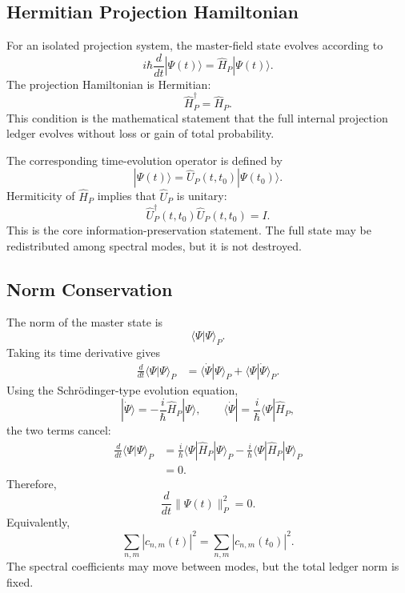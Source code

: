 \documentclass[11pt]{article}
\begin{document}
\subsection{Hermitian Projection Hamiltonian}

For an isolated projection system, the master-field state evolves according to
\begin{equation}
\boxed{
i\hbar\frac{d}{dt}|\Psi(t)\rangle
=
\widehat H_P|\Psi(t)\rangle .
}
\end{equation}
The projection Hamiltonian is Hermitian:
\begin{equation}
\boxed{
\widehat H_P^\dagger
=
\widehat H_P.
}
\end{equation}
This condition is the mathematical statement that the full internal projection
ledger evolves without loss or gain of total probability.

The corresponding time-evolution operator is defined by
\begin{equation}
\boxed{
|\Psi(t)\rangle
=
\widehat U_P(t,t_0)|\Psi(t_0)\rangle .
}
\end{equation}
Hermiticity of \(\widehat H_P\) implies that \(\widehat U_P\) is unitary:
\begin{equation}
\boxed{
\widehat U_P^\dagger(t,t_0)
\widehat U_P(t,t_0)
=
I.
}
\end{equation}
This is the core information-preservation statement. The full state may be
redistributed among spectral modes, but it is not destroyed.

\subsection{Norm Conservation}

The norm of the master state is
\begin{equation}
\langle\Psi|\Psi\rangle_P.
\end{equation}
Taking its time derivative gives
\begin{align}
\frac{d}{dt}\langle\Psi|\Psi\rangle_P
&=
\langle\dot\Psi|\Psi\rangle_P
+
\langle\Psi|\dot\Psi\rangle_P .
\end{align}
Using the Schrödinger-type evolution equation,
\begin{equation}
|\dot\Psi\rangle
=
-\frac{i}{\hbar}
\widehat H_P|\Psi\rangle,
\qquad
\langle\dot\Psi|
=
\frac{i}{\hbar}
\langle\Psi|\widehat H_P ,
\end{equation}
the two terms cancel:
\begin{align}
\frac{d}{dt}\langle\Psi|\Psi\rangle_P
&=
\frac{i}{\hbar}
\langle\Psi|\widehat H_P|\Psi\rangle_P
-
\frac{i}{\hbar}
\langle\Psi|\widehat H_P|\Psi\rangle_P
\\
&=
0.
\end{align}
Therefore,
\begin{equation}
\boxed{
\frac{d}{dt}\|\Psi(t)\|_P^2=0.
}
\end{equation}
Equivalently,
\begin{equation}
\boxed{
\sum_{n,m}|c_{n,m}(t)|^2
=
\sum_{n,m}|c_{n,m}(t_0)|^2.
}
\end{equation}
The spectral coefficients may move between modes, but the total ledger norm is
fixed.
\end{document}
